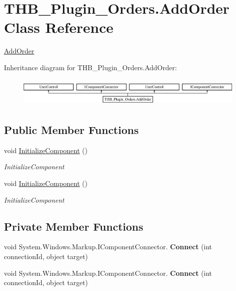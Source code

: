 \hypertarget{class_t_h_b___plugin___orders_1_1_add_order}{}\section{T\+H\+B\+\_\+\+Plugin\+\_\+\+Orders.\+Add\+Order Class Reference}
\label{class_t_h_b___plugin___orders_1_1_add_order}


\mbox{\hyperlink{class_t_h_b___plugin___orders_1_1_add_order}{Add\+Order}}  


Inheritance diagram for T\+H\+B\+\_\+\+Plugin\+\_\+\+Orders.\+Add\+Order\+:\begin{figure}[H]
\begin{center}
\leavevmode
\includegraphics[height=1.443299cm]{d4/d17/class_t_h_b___plugin___orders_1_1_add_order}
\end{center}
\end{figure}
\subsection*{Public Member Functions}
\begin{DoxyCompactItemize}
\item 
void \mbox{\hyperlink{class_t_h_b___plugin___orders_1_1_add_order_a89a7af41cf5bc108266f4a335ce5d7df}{Initialize\+Component}} ()
\begin{DoxyCompactList}\small\item\em Initialize\+Component \end{DoxyCompactList}\item 
void \mbox{\hyperlink{class_t_h_b___plugin___orders_1_1_add_order_a89a7af41cf5bc108266f4a335ce5d7df}{Initialize\+Component}} ()
\begin{DoxyCompactList}\small\item\em Initialize\+Component \end{DoxyCompactList}\end{DoxyCompactItemize}
\subsection*{Private Member Functions}
\begin{DoxyCompactItemize}
\item 
\mbox{\label{class_t_h_b___plugin___orders_1_1_add_order_abbc9a83974ca159364b21ec868014332}} 
void System.\+Windows.\+Markup.\+I\+Component\+Connector. {\bfseries Connect} (int connection\+Id, object target)
\item 
\mbox{\label{class_t_h_b___plugin___orders_1_1_add_order_abbc9a83974ca159364b21ec868014332}} 
void System.\+Windows.\+Markup.\+I\+Component\+Connector. {\bfseries Connect} (int connection\+Id, object target)
\end{DoxyCompactItemize}

